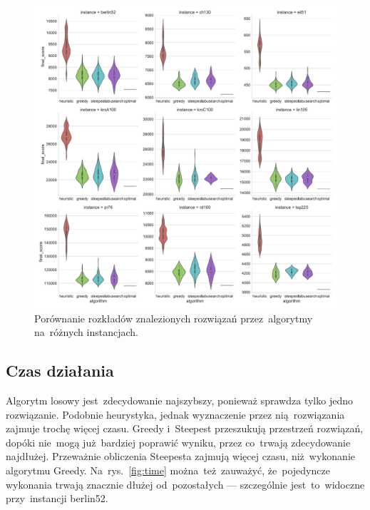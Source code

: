 \begin{figure}[H]
\begin{center}
\includegraphics[width=1.0\textwidth]{graphs/score_comparison_violin.pdf}
\end{center}
\caption{Porównanie rozkładów znalezionych rozwiązań przez~algorytmy na~różnych instancjach.}
\label{fig:distribution}
\end{figure}

\subsection{Czas działania}

Algorytm losowy jest~zdecydowanie najszybszy, ponieważ sprawdza tylko jedno rozwiązanie. Podobnie heurystyka, jednak wyznaczenie przez nią~rozwiązania zajmuje trochę więcej czasu. Greedy i~Steepest przeszukują przestrzeń rozwiązań, dopóki nie~mogą już~bardziej poprawić wyniku, przez co~trwają zdecydowanie najdłużej. Przeważnie obliczenia Steepesta zajmują więcej czasu, niż~wykonanie algorytmu Greedy. Na~rys.~\ref{fig:time} można~też~zauważyć, że~pojedyncze wykonania trwają znacznie dłużej od~pozostałych --- szczególnie jest~to~widoczne przy~instancji berlin52.


